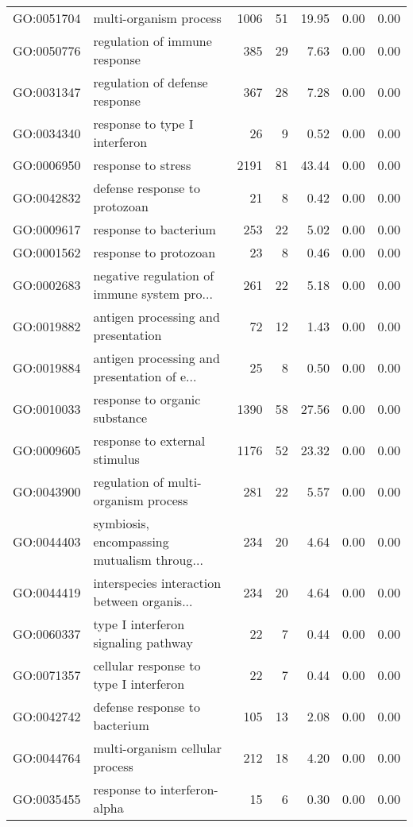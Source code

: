 \begin{table}[ht]
\begin{tabular}{llrrrrr}
  GO:0051704 & multi-organism process & 1006 &  51 & 19.95 & 0.00 & 0.00 \\ 
  GO:0050776 & regulation of immune response & 385 &  29 & 7.63 & 0.00 & 0.00 \\ 
  GO:0031347 & regulation of defense response & 367 &  28 & 7.28 & 0.00 & 0.00 \\ 
  GO:0034340 & response to type I interferon &  26 &   9 & 0.52 & 0.00 & 0.00 \\ 
  GO:0006950 & response to stress & 2191 &  81 & 43.44 & 0.00 & 0.00 \\ 
  GO:0042832 & defense response to protozoan &  21 &   8 & 0.42 & 0.00 & 0.00 \\ 
  GO:0009617 & response to bacterium & 253 &  22 & 5.02 & 0.00 & 0.00 \\ 
  GO:0001562 & response to protozoan &  23 &   8 & 0.46 & 0.00 & 0.00 \\ 
  GO:0002683 & negative regulation of immune system pro... & 261 &  22 & 5.18 & 0.00 & 0.00 \\ 
  GO:0019882 & antigen processing and presentation &  72 &  12 & 1.43 & 0.00 & 0.00 \\ 
  GO:0019884 & antigen processing and presentation of e... &  25 &   8 & 0.50 & 0.00 & 0.00 \\ 
  GO:0010033 & response to organic substance & 1390 &  58 & 27.56 & 0.00 & 0.00 \\ 
  GO:0009605 & response to external stimulus & 1176 &  52 & 23.32 & 0.00 & 0.00 \\ 
  GO:0043900 & regulation of multi-organism process & 281 &  22 & 5.57 & 0.00 & 0.00 \\ 
  GO:0044403 & symbiosis, encompassing mutualism throug... & 234 &  20 & 4.64 & 0.00 & 0.00 \\ 
  GO:0044419 & interspecies interaction between organis... & 234 &  20 & 4.64 & 0.00 & 0.00 \\ 
  GO:0060337 & type I interferon signaling pathway &  22 &   7 & 0.44 & 0.00 & 0.00 \\ 
  GO:0071357 & cellular response to type I interferon &  22 &   7 & 0.44 & 0.00 & 0.00 \\ 
  GO:0042742 & defense response to bacterium & 105 &  13 & 2.08 & 0.00 & 0.00 \\ 
  GO:0044764 & multi-organism cellular process & 212 &  18 & 4.20 & 0.00 & 0.00 \\ 
  GO:0035455 & response to interferon-alpha &  15 &   6 & 0.30 & 0.00 & 0.00 \\ 

\end{tabular}
\end{table}
